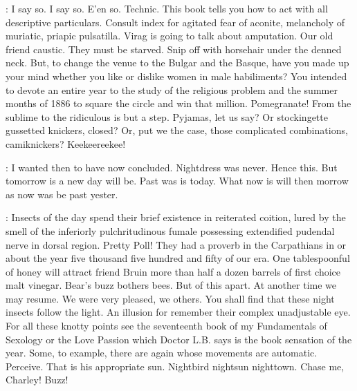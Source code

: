 \Virag:
I say so. I say so.
E'en so.
Technic.
This book tells you how to act with all descriptive particulars.
Consult index for agitated fear of aconite,
melancholy of muriatic, priapic pulsatilla.
Virag is going to talk about amputation.
Our old friend caustic.
They must be starved.
Snip off with horsehair under the denned neck.
But, to change the venue to the Bulgar and the Basque,
have you made up your mind whether you like or dislike women in male habiliments?
You intended to devote an entire year to the study
of the religious problem and the summer months of 1886
to square the circle and win that million.
Pomegranate!
From the sublime to the ridiculous is but a step.
Pyjamas, let us say?
Or stockingette gussetted knickers, closed?
Or, put we the case, those complicated combinations, camiknickers?
Keekeereekee!


\Bloom:
I wanted then to have now concluded.
Nightdress was never.
Hence this.
But tomorrow is a new day will be.
Past was is today.
What now is will then morrow
as now was be past yester.

\Virag:
Insects of the day spend their brief existence in reiterated coition,
lured by the smell of the inferiorly pulchritudinous fumale
possessing extendified pudendal nerve in dorsal region.
Pretty Poll!
They had a proverb in the Carpathians in or about the year
five thousand five hundred and fifty of our era.
One tablespoonful of honey will attract friend Bruin
more than half a dozen barrels of first choice malt vinegar.
Bear's buzz bothers bees.
But of this apart.
At another time we may resume.
We were very pleased, we others.
You shall find that these night insects follow the light.
An illusion for remember their complex unadjustable eye.
For all these knotty points see the seventeenth book
of my Fundamentals of Sexology or the Love Passion
which Doctor L.B. says is the book sensation of the year.
Some, to example, there are again whose movements are automatic.
Perceive.
That is his appropriate sun.
Nightbird nightsun nighttown.
Chase me, Charley!
Buzz!

